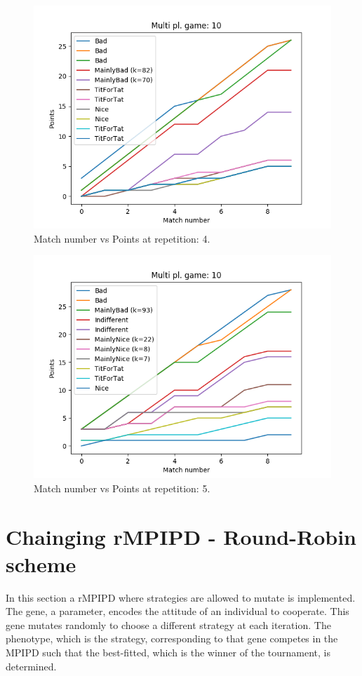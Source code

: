 \documentclass[journal,a4paper,10pt,twoside]{IEEEtran}
\begin{document}
\begin{figure}
    \centering
    \includegraphics[width=1\columnwidth]{../img_v1/ridpmp-scores-10-r3.png}
    \caption{Match number vs Points at repetition: 4.}
    \label{fig:rmpipd4}
\end{figure}

\begin{figure}
    \centering
    \includegraphics[width=1\columnwidth]{../img_v1/ridpmp-scores-10-r4.png}
    \caption{Match number vs Points at repetition: 5.}
    \label{fig:rmpipd5}
\end{figure}

\newpage
\section{Chainging rMPIPD - Round-Robin scheme} \label{crIPDMP}
In this section a rMPIPD where strategies are allowed to mutate is implemented. The gene, a parameter, encodes the attitude of an individual to cooperate. This gene mutates randomly to choose a different strategy at each iteration. The phenotype, which is the strategy, corresponding to that gene competes in the MPIPD such that the best-fitted, which is the winner of the tournament, is determined.
\end{document}

